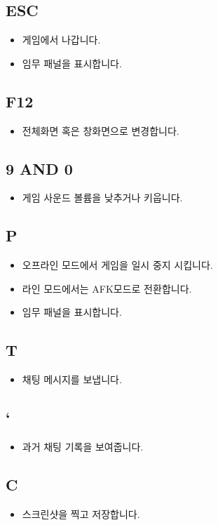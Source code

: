 \documentclass{report}
\begin{document}
\begin{flushleft}
    \subsection{ESC}
    \begin{itemize}
        \item 게임에서 나갑니다. 
        \item 임무 패널을 표시합니다. 
    \end{itemize}
    \subsection{F12}
    \begin{itemize}
        \item 전체화면 혹은 창화면으로 변경합니다. 
    \end{itemize}
    \subsection{9 AND 0}
    \begin{itemize}
        \item 게임 사운드 볼륨을 낮추거나 키웁니다.
    \end{itemize}
    \subsection{P}
    \begin{itemize}
        \item 오프라인 모드에서 게임을 일시 중지 시킵니다.
        \item 라인 모드에서는 AFK모드로 전환합니다.
        \item 임무 패널을 표시합니다.
    \end{itemize}
    \subsection{T}
    \begin{itemize}
        \item 채팅 메시지를 보냅니다. 
    \end{itemize}
    \subsection{`}
    \begin{itemize}
        \item 과거 채팅 기록을 보여줍니다. 
    \end{itemize}
    \subsection{C}
    \begin{itemize}
        \item 스크린샷을 찍고 저장합니다. 
    \end{itemize}
    

\end{flushleft}
\end{document}
